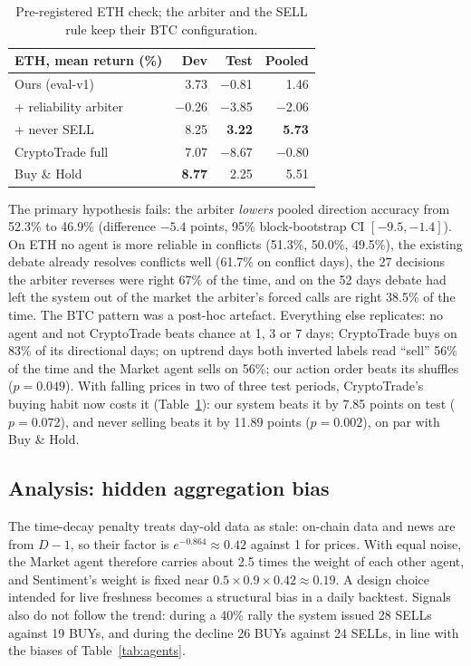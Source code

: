 \documentclass[11pt]{article}
\begin{document}
\begin{table}[t]
\centering
\small
\setlength{\tabcolsep}{4pt}
\begin{tabular}{lrrr}
\toprule
ETH, mean return (\%) & Dev & Test & Pooled \\
\midrule
Ours (eval-v1) & 3.73 & $-$0.81 & 1.46 \\
\quad + reliability arbiter & $-$0.26 & $-$3.85 & $-$2.06 \\
\quad + never SELL & 8.25 & \textbf{3.22} & \textbf{5.73} \\
CryptoTrade full & 7.07 & $-$8.67 & $-$0.80 \\
Buy \& Hold & \textbf{8.77} & 2.25 & 5.51 \\
\bottomrule
\end{tabular}
\caption{Pre-registered ETH check; the arbiter and the SELL rule keep their BTC configuration.}
\label{tab:eth}
\end{table}

The primary hypothesis fails: the arbiter \emph{lowers} pooled direction accuracy from 52.3\% to 46.9\% (difference
$-5.4$ points, 95\% block-bootstrap CI $[-9.5, -1.4]$). On ETH no agent is more reliable in conflicts (51.3\%, 50.0\%,
49.5\%), the existing debate already resolves conflicts well (61.7\% on conflict days), the 27 decisions the arbiter
reverses were right 67\% of the time, and on the 52 days debate had left the system out of the market the arbiter's
forced calls are right 38.5\% of the time. The BTC pattern was a post-hoc artefact. Everything else replicates: no agent
and not CryptoTrade beats chance at 1, 3 or 7 days; CryptoTrade buys on 83\% of its directional days; on uptrend days
both inverted labels read ``sell'' 56\% of the time and the Market agent sells on 56\%; our action order beats its shuffles
($p=0.049$). With falling prices in two of three test periods, CryptoTrade's buying habit now costs it
(Table~\ref{tab:eth}): our system beats it by 7.85 points on test ($p=0.072$), and never selling beats it by 11.89 points
($p=0.002$), on par with Buy \& Hold.

\subsection{Analysis: hidden aggregation bias}
The time-decay penalty treats day-old data as stale: on-chain data and news are from $D{-}1$, so their factor is
$e^{-0.864}\approx0.42$ against 1 for prices. With equal noise, the Market agent therefore carries about 2.5 times the
weight of each other agent, and Sentiment's weight is fixed near $0.5\times0.9\times0.42\approx0.19$. A design choice
intended for live freshness becomes a structural bias in a daily backtest. Signals also do not follow the trend: during
a 40\% rally the system issued 28 SELLs against 19 BUYs, and during the decline 26 BUYs against 24 SELLs, in line with the
biases of Table~\ref{tab:agents}.
\end{document}
